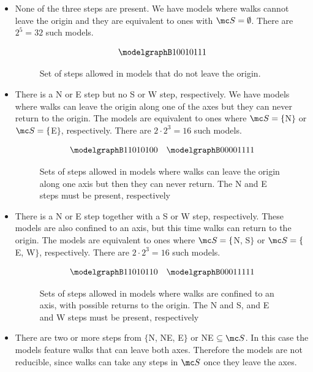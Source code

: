 \begin{itemize}
\item[1.] None of the three steps are present. We have models where walks cannot leave the origin and they are equivalent to ones with $\mc S = \emptyset$. There are $2^5 = 32$ such models.
\begin{figure}[H]
    \centering
\[
	\modelgraphB 10010111
\]
    \caption{Set of steps allowed in models that do not leave the origin.}
\end{figure}
\item[2.] There is a N or E step but no S or W step, respectively. We have models where walks can leave the origin along one of the axes but they can never return to the origin. The models are equivalent to ones where $\mc S = \{$N$\}$ or $\mc S = \{$E$\}$, respectively. There are $2\cdot2^3 = 16$ such models.
\begin{figure}[H]
    \centering
\[
	\modelgraphB 11010100 \quad \modelgraphB 00001111
\]
    \caption{Sets of steps allowed in models where walks can leave the origin along one axis but then they can never return. The N and E steps must be present, respectively}
\end{figure}
\item[3.] There is a N or E step together with a S or W step, respectively. These models are also confined to an axis, but this time walks can return to the origin. The models are equivalent to ones where $\mc S = \{$N, S$\}$ or $\mc S = \{$E, W$\}$, respectively.  There are $2\cdot2^3 = 16$ such models.
\begin{figure}[H]
    \centering
\[
	\modelgraphB 11010110 \quad \modelgraphB 00011111
\]
    \caption{Sets of steps allowed in models where walks are confined to an axis, with possible returns to the origin. The N and S, and E and W steps must be present, respectively}
\end{figure}
\item[4.] There are two or more steps from $\{$N, NE, E$\}$ or NE $\subseteq \mc S$. In this case the models feature walks that can leave both axes. Therefore the models are not reducible, since walks can take any steps in $\mc S$ once they leave the axes.
 \end{itemize}

